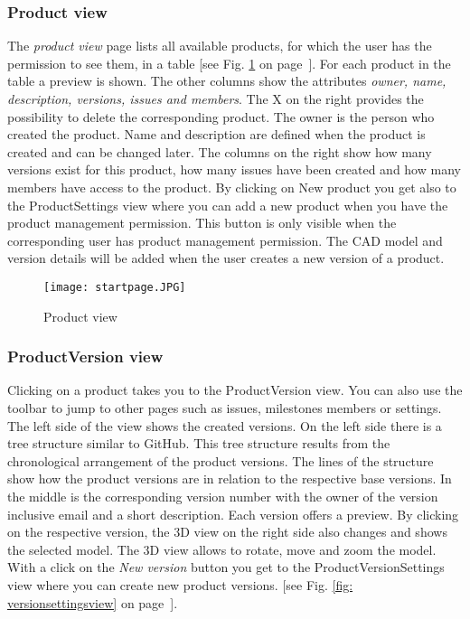     \subsubsection*{Product view}
    The \textit{product view} page lists all available products, for which the user has the permission to see them, in a table [see Fig. \ref{fig: startpage} on page~\pageref{fig: startpage}]. For each product in the table a preview is shown. The other columns show the attributes \textit{owner, name, description, versions, issues and members}. The X on the right provides the possibility to delete the corresponding product. The owner is the person who created the product. Name and description are defined when the product is created and can be changed later. The columns on the right show how many versions exist for this product, how many issues have been created and how many members have access to the product. By clicking on New product you get also to the ProductSettings view where you can add a new product when you have the product management permission. This button is only visible when the corresponding user has product management permission. The CAD model and version details will be added when the user creates a new version of a product.

    \begin{figure}[h]
        \centering
        \texttt{[image: startpage.JPG]}
        \caption{Product view}
        \label{fig: startpage}
    \end{figure}

    \subsubsection*{ProductVersion view}
    Clicking on a product takes you to the ProductVersion view. You can also use the toolbar to jump to other pages such as issues, milestones members or settings. The left side of the view shows the created versions. On the left side there is a tree structure similar to GitHub. This tree structure results from the chronological arrangement of the product versions. The lines of the structure show how the product versions are in relation to the respective base versions. In the middle is the corresponding version number with the owner of the version inclusive email and a short description. Each version offers a preview. By clicking on the respective version, the 3D view on the right side also changes and shows the selected model. The 3D view allows to rotate, move and zoom the model. 
    With a click on the \textit{New version} button you get to the ProductVersionSettings view where you can create new product versions. [see Fig. \ref{fig: versionsettingsview} on page~\pageref{fig: versionsettingsview}]. 

